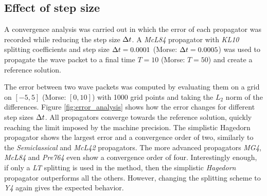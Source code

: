 \subsection{Effect of step size}
\label{subsec:convergence}
%
A convergence analysis was carried out in which the error of each propagator was recorded while reducing the step size $\Delta t$.
A \emph{McL84} propagator with \emph{KL10} splitting coefficients and step size $\Delta t = 0.0001$ (Morse: $\Delta t = 0.0005$) was used to propagate the wave packet to a final time $T = 10$ (Morse: $T=50$) and create a reference solution.
\par\medskip
%
The error between two wave packets was computed by evaluating them on a grid on $[-5,5]$ (Morse: $[0,10]$) with 1000 grid points and taking the $L_2$ norm of the differences.
Figure \ref{fig:error_analysis} shows how the error changes for different step sizes $\Delta t$.
All propagators converge towards the reference solution, quickly reaching the limit imposed by the machine precision.
The simplistic Hagedorn propagator shows the largest error and a convergence order of two, similarly to the \emph{Semiclassical} and \emph{McL42} propagators.
The more advanced propagators \emph{MG4}, \emph{McL84} and \emph{Pre764} even show a convergence order of four.
Interestingly enough, if only a \emph{LT} splitting is used in the  method, then the simplistic \emph{Hagedorn} propagator outperforms all the others. However, changing the splitting scheme to \emph{Y4} again gives the expected behavior.
%
